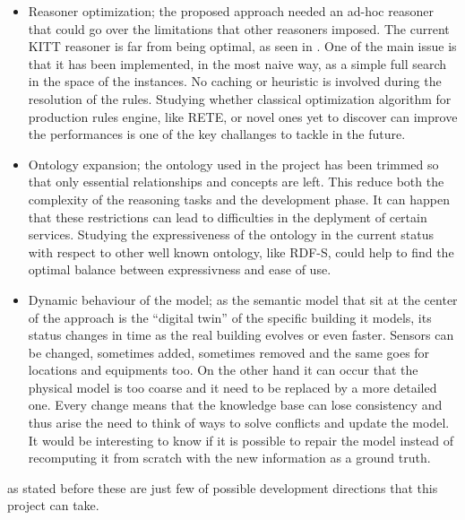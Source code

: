 \begin{itemize}
  \item Reasoner optimization; the proposed approach needed an ad-hoc reasoner that could go over the limitations that other reasoners imposed. The current KITT reasoner is far from being optimal, as seen in . One of the main issue is that it has been implemented, in the most naive way, as a simple full search in the space of the instances. No caching or heuristic is involved during the resolution of the rules. Studying whether classical optimization algorithm for production rules engine, like RETE, or novel ones yet to discover can improve the performances is one of the key challanges to tackle in the future.
  \item Ontology expansion; the ontology used in the project has been trimmed so that only essential relationships and concepts are left. This reduce both the complexity of the reasoning tasks and the development phase. It can happen that these restrictions can lead to difficulties in the deplyment of certain services. Studying the expressiveness of the ontology in the current status with respect to other well known ontology, like RDF-S, could help to find the optimal balance between expressivness and ease of use.
  \item Dynamic behaviour of the model; as the semantic model that sit at the center of the approach is the ``digital twin'' of the specific building it models, its status changes in time as the real building evolves or even faster. Sensors can be changed, sometimes added, sometimes removed and the same goes for locations and equipments too. On the other hand it can occur that the physical model is too coarse and it need to be replaced by a more detailed one. Every change means that the knowledge base can lose consistency and thus arise the need to think of ways to solve conflicts and update the model. It would be interesting to know if it is possible to repair the model instead of recomputing it from scratch with the new information as a ground truth.
\end{itemize}
as stated before these are just few of possible development directions that this project can take.

